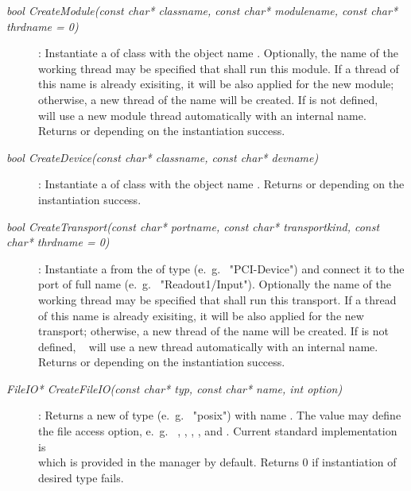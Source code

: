 \begin{description}
	 
\item[\em bool CreateModule\small (const char* classname, const char* modulename, const char* thrdname = 0)] : 
Instantiate a  of class  with the object name
. Optionally, the name of the working thread  may
be specified that shall run this module. If a thread of this name is already exisiting, 
it will be also applied for the new module; otherwise, a new thread of the name
will be created. If  is not defined, \dabc~ will use a new module
thread automatically with an internal name.
Returns  or  depending on the instantiation success.

\item[\em bool CreateDevice\small (const char* classname, const char* devname)]:
Instantiate a  of class  with the object name
. Returns  or  depending on the instantiation success.






\item[\em bool CreateTransport\small (const char* portname, const char* transportkind, const char* thrdname = 0)] :
Instantiate a  from the  of type  
(e.~g.~ "PCI-Device")
and connect it to the port of full name  (e.~g.~ "Readout1/Input"). 
Optionally the name of the working thread
 may
be specified that shall run this transport. If a thread of this name is already exisiting, 
it will be also applied for the new transport; otherwise, a new thread of the name
will be created. If  is not defined, \dabc~ will use a new 
thread automatically with an internal name.
Returns  or  depending on the instantiation success.


\item[\em FileIO* CreateFileIO\small (const char* typ, const char* name, int option)] :
Returns a new  of type  (e.~g.~ "posix") with name
. The  value may define the file access option,
e.~g.~ , , , , and 
. Current standard implementation is \\
which is provided in the manager by default.
Returns $0$ if instantiation of desired type fails.


\end{description}
